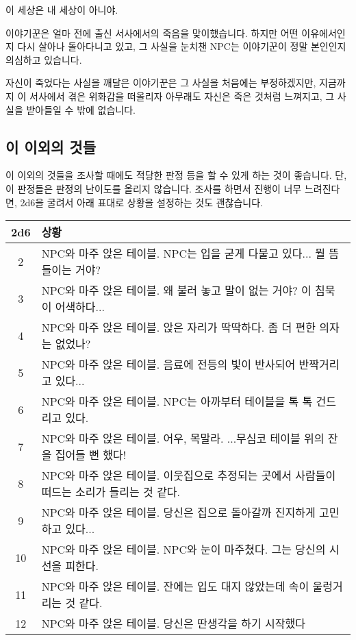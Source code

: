 \documentclass{report}
\begin{document}
	\begin{lite}{이 세상은 내 세상이 아니야.}
	\end{lite}
	
	이야기꾼은 얼마 전에 출신 서사에서의 죽음을 맞이했습니다. 하지만 어떤 이유에서인지 다시 살아나 돌아다니고 있고, 그 사실을 눈치챈 NPC는 이야기꾼이 정말 본인인지 의심하고 있습니다.
	
	자신이 죽었다는 사실을 깨달은 이야기꾼은 그 사실을 처음에는 부정하겠지만, 지금까지 이 서사에서 겪은 위화감을 떠올리자 아무래도 자신은 죽은 것처럼 느껴지고, 그 사실을 받아들일 수 밖에 없습니다.
	
	\subsection{이 이외의 것들}
	이 이외의 것들을 조사할 때에도 적당한 판정 등을 할 수 있게 하는 것이 좋습니다. 단, 이 판정들은 판정의 난이도를 올리지 않습니다. 조사를 하면서 진행이 너무 느려진다면, 2d6을 굴려서 아래 표대로 상황을 설정하는 것도 괜찮습니다.
	
	\smallskip
	
	\begin{tabularx}{\linewidth}{c!{\color{black}\vrule}X}
		2d6&상황\\\hline\hline
		
		2&NPC와 마주 앉은 테이블. NPC는 입을 굳게 다물고 있다... 뭘 뜸들이는 거야?\\\hline
		
		3&NPC와 마주 앉은 테이블. 왜 불러 놓고 말이 없는 거야? 이 침묵이 어색하다...\\\hline
		
		4&NPC와 마주 앉은 테이블. 앉은 자리가 딱딱하다. 좀 더 편한 의자는 없었나?\\\hline
		
		5&NPC와 마주 앉은 테이블. 음료에 전등의 빛이 반사되어 반짝거리고 있다...\\\hline
		
		6&NPC와 마주 앉은 테이블. NPC는 아까부터 테이블을 톡 톡 건드리고 있다.\\\hline
		
		7&NPC와 마주 앉은 테이블. 어우, 목말라. ...무심코 테이블 위의 잔을 집어들 뻔 했다!\\\hline
		
		8&NPC와 마주 앉은 테이블. 이웃집으로 추정되는 곳에서 사람들이 떠드는 소리가  들리는 것 같다.\\\hline
		
		9&NPC와 마주 앉은 테이블. 당신은 집으로 돌아갈까 진지하게 고민하고 있다...\\\hline
		
		10&NPC와 마주 앉은 테이블. NPC와 눈이 마주쳤다. 그는 당신의 시선을 피한다.\\\hline
		
		11&NPC와 마주 앉은 테이블. 잔에는 입도 대지 않았는데 속이 울렁거리는 것 같다.\\\hline
		
		12&NPC와 마주 앉은 테이블. 당신은 딴생각을 하기 시작했다
	\end{tabularx}
	
\end{document}
